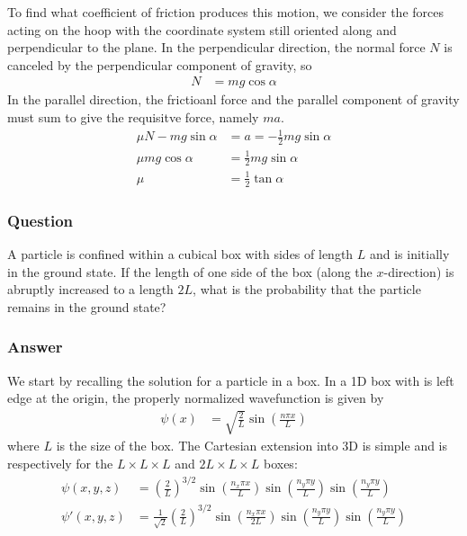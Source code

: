 To find what coefficient of friction produces this motion, we consider the
forces acting on the hoop with the coordinate system still oriented along and
perpendicular to the plane. In the perpendicular direction, the normal force
$N$ is canceled by the perpendicular component of gravity, so
\begin{align*}
    N &= mg\cos α
\end{align*}
In the parallel direction, the frictioanl force and the parallel component of
gravity must sum to give the requisitve force, namely $ma$.
\begin{align*}
    μN - mg\sin α &= a = -\frac 12 mg\sin α \\
    μmg\cos α &= \frac 12 mg\sin α \\
    μ &= \frac 12 \tan α
\end{align*}


\subsubsection{Question}

A particle is confined within a cubical box with sides of length $L$ and is
initially in the ground state. If the length of one side of the box (along
the $x$-direction) is abruptly increased to a length $2L$, what is the
probability that the particle remains in the ground state?

\subsubsection{Answer}

We start by recalling the solution for a particle in a box. In a 1D box with is
left edge at the origin, the properly normalized wavefunction is given by
\begin{align*}
    ψ(x) &= \sqrt{\frac{2}{L}} \sin (\frac{nπx}{L})
\end{align*}
where $L$ is the size of the box. The Cartesian extension into 3D is simple
and is respectively for the $L×L×L$ and $2L×L×L$ boxes:
\begin{align*}
    ψ(x,y,z) &= (\frac{2}{L})^{3/2} \sin(\frac{n_x πx}{L})
	\sin(\frac{n_y πy}{L}) \sin(\frac{n_y πy}{L}) \\
    ψ'(x,y,z) &= \frac{1}{\sqrt 2}(\frac{2}{L})^{3/2} \sin(\frac{n_x πx}{2L})
	\sin(\frac{n_y πy}{L}) \sin(\frac{n_y πy}{L})
\end{align*}

